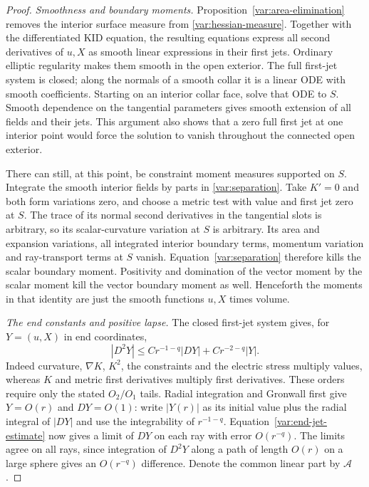 \begin{proof}
\emph{Smoothness and boundary moments.}
Proposition~\ref{var:area-elimination} removes the interior
surface measure from \eqref{var:hessian-measure}.  Together
with the differentiated KID equation, the resulting equations
express all second derivatives of $u,X$ as smooth linear
expressions in their first jets.  Ordinary elliptic
regularity makes them smooth in the open exterior.  The full
first-jet system is closed; along the normals of a smooth
collar it is a linear ODE with smooth coefficients.  Starting
on an interior collar face, solve that ODE to $S$.
Smooth dependence on the tangential parameters gives smooth
extension of all fields and their jets.  This argument also
shows that a zero full first jet at one interior point would
force the solution to vanish throughout the connected open
exterior.

There can still, at this point, be constraint moment measures
supported on $S$.  Integrate the smooth interior fields by
parts in \eqref{var:separation}.  Take $K'=0$ and both form
variations zero, and choose a metric test with value and
first jet zero at $S$.  The trace of its normal second
derivatives in the tangential slots is arbitrary, so its
scalar-curvature variation at $S$ is arbitrary.  Its area
and expansion variations, all integrated interior boundary
terms, momentum variation and ray-transport terms at $S$
vanish.  Equation~\eqref{var:separation} therefore kills
the scalar boundary moment.  Positivity and domination of
the vector moment by the scalar moment kill the vector
boundary moment as well.  Henceforth the moments in that
identity are just the smooth functions $u,X$ times volume.

\emph{The end constants and positive lapse.}
The closed first-jet system gives, for $Y=(u,X)$ in end
coordinates,
\begin{equation}
 |D^2Y|\le C r^{-1-q}|DY|+C r^{-2-q}|Y|.
 \label{var:end-jet-estimate}
\end{equation}
Indeed curvature, $\nabla K$, $K^2$, the constraints and
the electric stress multiply values, whereas $K$ and
metric first derivatives multiply first derivatives.
These orders require only the stated $O_2/O_1$ tails.
Radial integration and Gronwall first give $Y=O(r)$ and
$DY=O(1)$: write $|Y(r)|$ as its initial value plus the
radial integral of $|DY|$ and use the integrability of
$r^{-1-q}$.  Equation~\eqref{var:end-jet-estimate} now
gives a limit of $DY$ on each ray with error $O(r^{-q})$.
The limits agree on all rays, since integration of $D^2Y$
along a path of length $O(r)$ on a large sphere gives an
$O(r^{-q})$ difference.  Denote the common linear part by
$\mathcal A$.


\end{proof}
